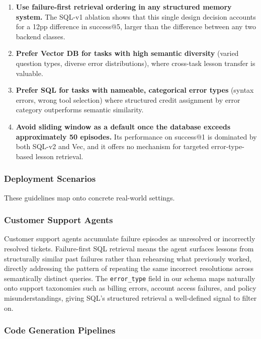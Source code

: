 \documentclass{article}
\begin{document}
\begin{enumerate}
  \item \textbf{Use failure-first retrieval ordering in any structured
    memory system.} The SQL-v1 ablation shows that this single design
    decision accounts for a 12pp difference in success@5, larger than the
    difference between any two backend classes.
  \item \textbf{Prefer Vector DB for tasks with high semantic diversity}
    (varied question types, diverse error distributions), where cross-task
    lesson transfer is valuable.
  \item \textbf{Prefer SQL for tasks with nameable, categorical error
    types} (syntax errors, wrong tool selection) where structured credit
    assignment by error category outperforms semantic similarity.
  \item \textbf{Avoid sliding window as a default once the database exceeds
    approximately 50 episodes.} Its performance on success@1 is dominated
    by both SQL-v2 and Vec, and it offers no mechanism for targeted
    error-type-based lesson retrieval.
\end{enumerate}

\subsubsection*{Deployment Scenarios}

These guidelines map onto concrete real-world settings.

\subsubsection*{Customer Support Agents}

Customer support agents accumulate failure episodes as unresolved or
incorrectly resolved tickets. Failure-first SQL retrieval means the agent
surfaces lessons from structurally similar past failures rather than
rehearsing what previously worked, directly addressing the pattern of
repeating the same incorrect resolutions across semantically distinct
queries. The \texttt{error\_type} field in our schema maps naturally onto
support taxonomies such as billing errors, account access failures, and
policy misunderstandings, giving SQL's structured retrieval a well-defined
signal to filter on.

\subsubsection*{Code Generation Pipelines}
\end{document}
